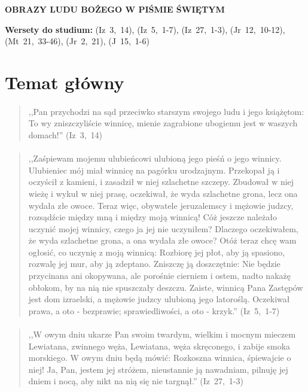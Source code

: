\documentclass[10pt,a4paper,oneside]{article}
\begin{document}
\centerline{\textbf{\MakeUppercase{Obrazy Ludu Bożego w Piśmie Świętym}}}
\begin{center}
\textbf{Wersety do studium:} \mbox{(Iz 3, 14)}, \mbox{(Iz 5, 1-7)}, \mbox{(Iz 27, 1-3)}, \mbox{(Jr 12, 10-12)}, \mbox{(Mt 21, 33-46)}, \mbox{(Jr 2, 21)}, \mbox{(J 15, 1-6)}
\end{center}
\section{Temat główny}
\paragraph{}
\begin{quote}
,,Pan przychodzi na sąd przeciwko starszym swojego ludu i jego książętom: To wy zniszczyliście winnicę, mienie zagrabione ubogiemu jest w waszych domach!'' \mbox{(Iz 3, 14)}
\end{quote}
\paragraph{}
\begin{quote}
,,Zaśpiewam mojemu ulubieńcowi ulubioną jego pieśń o jego winnicy. Ulubieniec mój miał winnicę na pagórku urodzajnym. Przekopał ją i oczyścił z kamieni, i zasadził w niej szlachetne szczepy. Zbudował w niej wieżę i wykuł w niej prasę, oczekiwał, że wyda szlachetne grona, lecz ona wydała złe owoce. Teraz więc, obywatele jeruzalemscy i mężowie judzcy, rozsądźcie między mną i między moją winnicą! Cóż jeszcze należało uczynić mojej winnicy, czego ja jej nie uczyniłem? Dlaczego oczekiwałem, że wyda szlachetne grona, a ona wydała złe owoce? Otóż teraz chcę wam ogłosić, co uczynię z moją winnicą: Rozbiorę jej płot, aby ją spasiono, rozwalę jej mur, aby ją zdeptano. Zniszczę ją doszczętnie: Nie będzie przycinana ani okopywana, ale porośnie cierniem i ostem, nadto nakażę obłokom, by na nią nie spuszczały deszczu. Zaiste, winnicą Pana Zastępów jest dom izraelski, a mężowie judzcy ulubioną jego latoroślą. Oczekiwał prawa, a oto - bezprawie; sprawiedliwości, a oto - krzyk.'' \mbox{(Iz 5, 1-7)}
\end{quote}
\paragraph{}
\begin{quote}
,,W owym dniu ukarze Pan swoim twardym, wielkim i mocnym mieczem Lewiatana, zwinnego węża, Lewiatana, węża skręconego, i zabije smoka morskiego. W owym dniu będą mówić: Rozkoszna winnica, śpiewajcie o niej! Ja, Pan, jestem jej stróżem, nieustannie ją nawadniam, pilnuję jej dniem i nocą, aby nikt na nią się nie targnął.'' \mbox{(Iz 27, 1-3)}
\end{quote}
\end{document}
